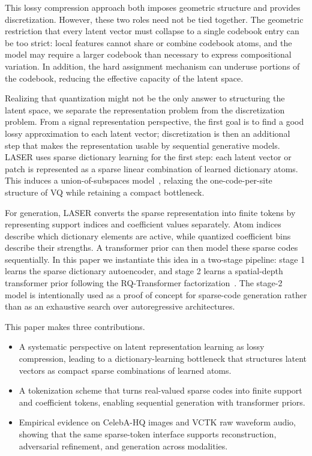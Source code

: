 \documentclass[10pt]{article}
\begin{document}
This lossy compression approach both imposes geometric structure and provides discretization. However, these two roles need not be tied together. The geometric restriction that every latent vector must collapse to a single codebook entry can be too strict: local features cannot share or combine codebook atoms, and the model may require a larger codebook than necessary to express compositional variation. In addition, the hard assignment mechanism can underuse portions of the codebook, reducing the effective capacity of the latent space.

Realizing that quantization might not be the only answer to structuring the latent space, we separate the representation problem from the discretization problem. From a signal representation perspective, the first goal is to find a good lossy approximation to each latent vector; discretization is then an additional step that makes the representation usable by sequential generative models. LASER uses sparse dictionary learning for the first step: each latent vector or patch is represented as a sparse linear combination of learned dictionary atoms. This induces a union-of-subspaces model~\citep{olshausen1997sparse,aharon2006ksvd,tropp2007omp}, relaxing the one-code-per-site structure of VQ while retaining a compact bottleneck.

For generation, LASER converts the sparse representation into finite tokens by representing support indices and coefficient values separately. Atom indices describe which dictionary elements are active, while quantized coefficient bins describe their strengths. A transformer prior can then model these sparse codes sequentially. In this paper we instantiate this idea in a two-stage pipeline: stage 1 learns the sparse dictionary autoencoder, and stage 2 learns a spatial-depth transformer prior following the RQ-Transformer factorization~\citep{lee2022rqvae}. The stage-2 model is intentionally used as a proof of concept for sparse-code generation rather than as an exhaustive search over autoregressive architectures.

This paper makes three contributions.

\begin{itemize}
    \item A systematic perspective on latent representation learning as lossy compression, leading to a dictionary-learning bottleneck that structures latent vectors as compact sparse combinations of learned atoms.
    \item A tokenization scheme that turns real-valued sparse codes into finite support and coefficient tokens, enabling sequential generation with transformer priors.
    \item Empirical evidence on CelebA-HQ images and VCTK raw waveform audio, showing that the same sparse-token interface supports reconstruction, adversarial refinement, and generation across modalities.
\end{itemize}
\end{document}
